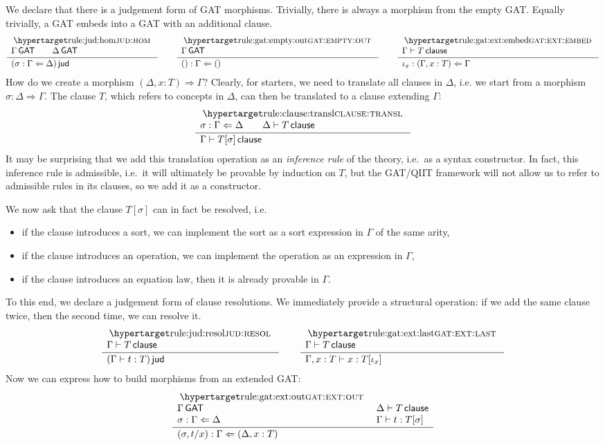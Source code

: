 \documentclass[a4paper]{article}
\begin{document}
We declare that there is a judgement form of GAT morphisms.
Trivially, there is always a morphism from the empty GAT.
Equally trivially, a GAT embeds into a GAT with an additional clause.
\[
	\inferencel{jud:hom}{
		\Gamma \GAT \qquad
		\Delta \GAT
	}{
		(\sigma : \Gamma \Leftarrow \Delta) \jud
	}{}
	\qquad
	\inferencel{gat:empty:out}{
		\Gamma \GAT
	}{
		() : \Gamma \Leftarrow ()
	}{}
	\qquad
	\inferencel{gat:ext:embed}{
		\Gamma \sez T \clause
	}{
		\iota_x : (\Gamma, x : T) \Leftarrow \Gamma
	}{}
\]
How do we create
a morphism $(\Delta, x : T) \Rightarrow \Gamma$? Clearly, for starters, we need to translate all clauses in $\Delta$, i.e. we start from a morphism $\sigma : \Delta \Rightarrow \Gamma$.
The clause $T$, which refers to concepts in $\Delta$, can then be translated to a clause extending $\Gamma$:
\[
	\inferencel{clause:transl}{
		\sigma : \Gamma \Leftarrow \Delta \qquad
		\Delta \sez T \clause
	}{
		\Gamma \sez T[\sigma] \clause
	}{}
\]
It may be surprising that we add this translation operation as an \emph{inference rule} of the theory, i.e.\ as a syntax constructor.
In fact, this inference rule is admissible, i.e.\ it will ultimately be provable by induction on $T$, but the GAT/QIIT framework will not allow us to refer to admissible rules in its clauses, so we add it as a constructor.

We now ask that the clause $T[\sigma]$ can in fact be resolved, i.e.
\begin{itemize}[noitemsep]
	\item if the clause introduces a sort, we can implement the sort as a sort expression in $\Gamma$ of the same arity,
	\item if the clause introduces an operation, we can implement the operation as an expression in $\Gamma$,
	\item if the clause introduces an equation law, then it is already provable in $\Gamma$.
\end{itemize}
To this end, we declare a judgement form of clause resolutions.
We immediately provide a structural operation: if we add the same clause twice, then the second time, we can resolve it.
\[
	\inferencel{jud:resol}{
		\Gamma \sez T \clause
	}{
		(\Gamma \sez t : T) \jud
	}{}
	\qquad
	\inferencel{gat:ext:last}{
		\Gamma \sez T \clause
	}{
		\Gamma, x : T \sez x : T[\iota_x]
	}{}
\]
Now we can express how to build morphisms from an extended GAT:
\[
	\inferencel{gat:ext:out}{
		\Gamma \GAT &
		\Delta \sez T \clause \\
		\sigma : \Gamma \Leftarrow \Delta &
		\Gamma \sez t : T[\sigma]
	}{
		(\sigma, t/x) : \Gamma \Leftarrow (\Delta, x : T)
	}{}
\]
\end{document}
